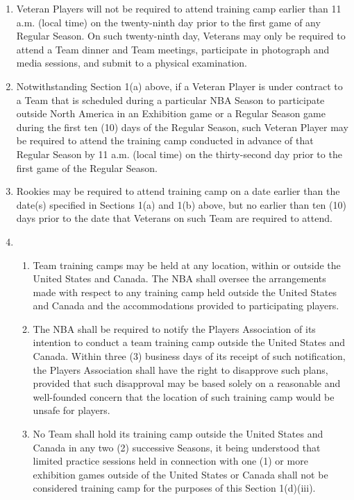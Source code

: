 \documentclass[
]{book}
\providecommand{\tightlist}{%
  \setlength{\itemsep}{0pt}\setlength{\parskip}{0pt}}
\begin{document}
\begin{enumerate}
\def\labelenumi{(\alph{enumi})}
\item
  Veteran Players will not be required to attend training camp earlier than 11 a.m. (local time) on the twenty-ninth day prior to the first game of any Regular Season. On such twenty-ninth day, Veterans may only be required to attend a Team dinner and Team meetings, participate in photograph and media sessions, and submit to a physical examination.
\item
  Notwithstanding Section 1(a) above, if a Veteran Player is under contract to a Team that is scheduled during a particular NBA Season to participate outside North America in an Exhibition game or a Regular Season game during the first ten (10) days of the Regular Season, such Veteran Player may be required to attend the training camp conducted in advance of that Regular Season by 11 a.m. (local time) on the thirty-second day prior to the first game of the Regular Season.
\item
  Rookies may be required to attend training camp on a date earlier than the date(s) specified in Sections 1(a) and 1(b) above, but no earlier than ten (10) days prior to the date that Veterans on such Team are required to attend.
\item
  \begin{enumerate}
  \def\labelenumii{(\roman{enumii})}
  \tightlist
  \item
    Team training camps may be held at any location, within or outside the United States and Canada. The NBA shall oversee the arrangements made with respect to any training camp held outside the United States and Canada and the accommodations provided to participating players.
  \item
    The NBA shall be required to notify the Players Association of its intention to conduct a team training camp outside the United States and Canada. Within three (3) business days of its receipt of such notification, the Players Association shall have the right to disapprove such plans, provided that such disapproval may be based solely on a reasonable and well-founded concern that the location of such training camp would be unsafe for players.
  \item
    No Team shall hold its training camp outside the United States and Canada in any two (2) successive Seasons, it being understood that limited practice sessions held in connection with one (1) or more exhibition games outside of the United States or Canada shall not be considered training camp for the purposes of this Section 1(d)(iii).

\end{enumerate}
\end{enumerate}
\end{document}
